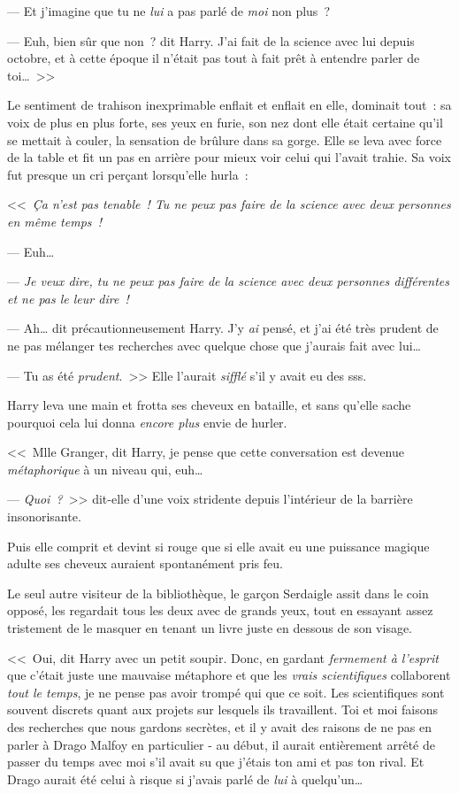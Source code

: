 --- Et j'imagine que tu ne \emph{lui} a pas parlé de \emph{moi} non plus~?

--- Euh, bien sûr que non~? dit Harry. J'ai fait de la science avec lui depuis octobre, et à cette époque il n'était pas tout à fait prêt à entendre parler de toi…~>>

Le sentiment de trahison inexprimable enflait et enflait en elle, dominait tout~: sa voix de plus en plus forte, ses yeux en furie, son nez dont elle était certaine qu'il se mettait à couler, la sensation de brûlure dans sa gorge. Elle se leva avec force de la table et fit un pas en arrière pour mieux voir celui qui l'avait trahie. Sa voix fut presque un cri perçant lorsqu'elle hurla~:

<<~\emph{Ça n'est pas tenable~! Tu ne peux pas faire de la science avec deux personnes en même temps~!}

--- Euh…

--- \emph{Je veux dire, tu ne peux pas faire de la science avec deux personnes différentes et ne pas le leur dire~!}

--- Ah… dit précautionneusement Harry. J'y \emph{ai} pensé, et j'ai été très prudent de ne pas mélanger tes recherches avec quelque chose que j'aurais fait avec lui…

--- Tu as été \emph{prudent}.~>> Elle l'aurait \emph{sifflé} s'il y avait eu des sss.

Harry leva une main et frotta ses cheveux en bataille, et sans qu'elle sache pourquoi cela lui donna \emph{encore plus} envie de hurler.

<<~Mlle Granger, dit Harry, je pense que cette conversation est devenue \emph{métaphorique} à un niveau qui, euh…

--- \emph{Quoi~?}~>> dit-elle d'une voix stridente depuis l'intérieur de la barrière insonorisante.

Puis elle comprit et devint si rouge que si elle avait eu une puissance magique adulte ses cheveux auraient spontanément pris feu.

Le seul autre visiteur de la bibliothèque, le garçon Serdaigle assit dans le coin opposé, les regardait tous les deux avec de grands yeux, tout en essayant assez tristement de le masquer en tenant un livre juste en dessous de son visage.

<<~Oui, dit Harry avec un petit soupir. Donc, en gardant \emph{fermement à l'esprit} que c'était juste une mauvaise métaphore et que les \emph{vrais scientifiques} collaborent \emph{tout le temps}, je ne pense pas avoir trompé qui que ce soit. Les scientifiques sont souvent discrets quant aux projets sur lesquels ils travaillent. Toi et moi faisons des recherches que nous gardons secrètes, et il y avait des raisons de ne pas en parler à Drago Malfoy en particulier - au début, il aurait entièrement arrêté de passer du temps avec moi s'il avait su que j'étais ton ami et pas ton rival. Et Drago aurait été celui à risque si j'avais parlé de \emph{lui} à quelqu'un…

